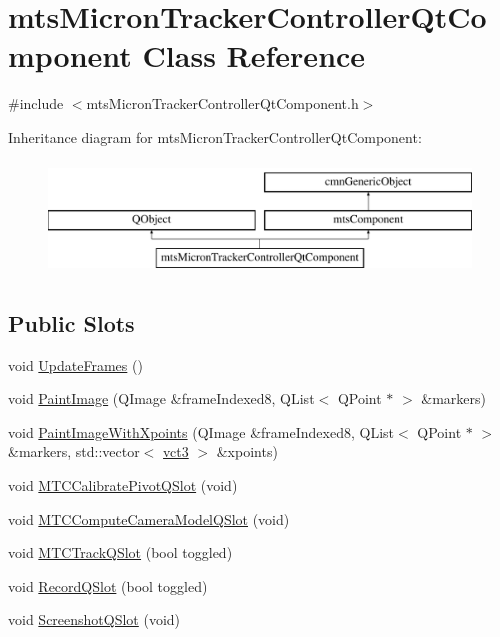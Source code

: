 \hypertarget{classmts_micron_tracker_controller_qt_component}{}\section{mts\+Micron\+Tracker\+Controller\+Qt\+Component Class Reference}
\label{classmts_micron_tracker_controller_qt_component}


{\ttfamily \#include $<$mts\+Micron\+Tracker\+Controller\+Qt\+Component.\+h$>$}

Inheritance diagram for mts\+Micron\+Tracker\+Controller\+Qt\+Component\+:\begin{figure}[H]
\begin{center}
\leavevmode
\includegraphics[height=3.000000cm]{d5/d03/classmts_micron_tracker_controller_qt_component}
\end{center}
\end{figure}
\subsection*{Public Slots}
\begin{DoxyCompactItemize}
\item 
void \hyperlink{classmts_micron_tracker_controller_qt_component_af3659dd1929cbf9e4c29f5523b932808}{Update\+Frames} ()
\item 
void \hyperlink{classmts_micron_tracker_controller_qt_component_a032e41bba072daf42260c3a60f2a5cac}{Paint\+Image} (Q\+Image \&frame\+Indexed8, Q\+List$<$ Q\+Point $\ast$ $>$ \&markers)
\item 
void \hyperlink{classmts_micron_tracker_controller_qt_component_ac556c6d8147a702ce23df9b134a3f6a6}{Paint\+Image\+With\+Xpoints} (Q\+Image \&frame\+Indexed8, Q\+List$<$ Q\+Point $\ast$ $>$ \&markers, std\+::vector$<$ \hyperlink{vct_fixed_size_vector_types_8h_a3af82acdbf4eeb73c551909240b106ea}{vct3} $>$ \&xpoints)
\item 
void \hyperlink{classmts_micron_tracker_controller_qt_component_a648e184aaaa06b0e5900539b43cffa94}{M\+T\+C\+Calibrate\+Pivot\+Q\+Slot} (void)
\item 
void \hyperlink{classmts_micron_tracker_controller_qt_component_a0cfa5816fdd883e2eeed1f67d412b092}{M\+T\+C\+Compute\+Camera\+Model\+Q\+Slot} (void)
\item 
void \hyperlink{classmts_micron_tracker_controller_qt_component_a66528ff13d9bceff414f6470bd7a32cd}{M\+T\+C\+Track\+Q\+Slot} (bool toggled)
\item 
void \hyperlink{classmts_micron_tracker_controller_qt_component_a474618f51b5d7d9c85569c3b0491c8dd}{Record\+Q\+Slot} (bool toggled)
\item 
void \hyperlink{classmts_micron_tracker_controller_qt_component_a60304e6ce11bb9b7a529ffaeaac42c38}{Screenshot\+Q\+Slot} (void)
\end{DoxyCompactItemize}
